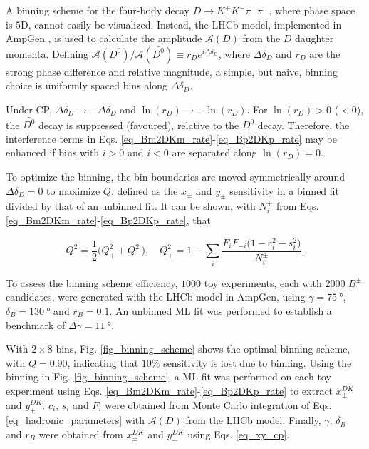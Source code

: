 \documentclass[12pt, a4paper, notitlepage, onecolumn]{article}
\begin{document}
A binning scheme for the four-body decay $D\to K^+K^-\pi^+\pi^-$, where phase space is $5$D, cannot easily be visualized. Instead, the LHCb model, implemented in AmpGen \cite{cite_AmpGen}, is used to calculate the amplitude $\mathcal{A}(D)$ from the $D$ daughter momenta. Defining $\mathcal{A}(D^0)/\mathcal{A}(\bar{D^0})\equiv r_De^{i\Delta\delta_D}$, where $\Delta\delta_D$ and $r_D$ are the strong phase difference and relative magnitude, a simple, but naive, binning choice is uniformly spaced bins along $\Delta\delta_D$.

Under CP, $\Delta\delta_D\to -\Delta\delta_D$ and $\ln(r_D)\to -\ln(r_D)$. For $\ln(r_D) > 0$ ($< 0$), the $\bar{D^0}$ decay is suppressed (favoured), relative to the $D^0$ decay. Therefore, the interference terms in Eqs. \eqref{eq_Bm2DKm_rate}-\eqref{eq_Bp2DKp_rate} may be enhanced if bins with $i > 0$ and $i < 0$ are separated along $\ln(r_D) = 0$.

To optimize the binning, the bin boundaries are moved symmetrically around $\Delta\delta_D = 0$ to maximize $Q$, defined as the $x_\pm$ and $y_\pm$ sensitivity in a binned fit divided by that of an unbinned fit. It can be shown, with $N_i^\pm$ from Eqs. \eqref{eq_Bm2DKm_rate}-\eqref{eq_Bp2DKp_rate}, that

\begin{equation*}
  Q^2 = \frac{1}{2}\big(Q^2_+ + Q^2_-\big), \quad Q^2_\pm = 1 - \sum_i\frac{F_iF_{-i}\big(1 - c_i^2 - s_i^2\big)}{N_i^\pm}.
\end{equation*}

To assess the binning scheme efficiency, $1000$ toy experiments, each with $2000$ $B^\pm$ candidates, were generated with the LHCb model in AmpGen, using $\gamma = \SI{75}{\degree}$, $\delta_B = \SI{130}{\degree}$ and $r_B = 0.1$. An unbinned ML fit was performed to establish a benchmark of $\Delta\gamma = \SI{11}{\degree}$.

With $2\times 8$ bins, Fig. \ref{fig_binning_scheme} shows the optimal binning scheme, with $Q = 0.90$, indicating that $10\%$ sensitivity is lost due to binning. Using the binning in Fig. \ref{fig_binning_scheme}, a ML fit was performed on each toy experiment using Eqs. \eqref{eq_Bm2DKm_rate}-\eqref{eq_Bp2DKp_rate} to extract $x_\pm^{DK}$ and $y_\pm^{DK}$. $c_i$, $s_i$ and $F_i$ were obtained from Monte Carlo integration of Eqs. \eqref{eq_hadronic_parameters} with $\mathcal{A}(D)$ from the LHCb model. Finally, $\gamma$, $\delta_B$ and $r_B$ were obtained from $x_\pm^{DK}$ and $y_\pm^{DK}$ using Eqs. \eqref{eq_xy_cp}.
\end{document}
